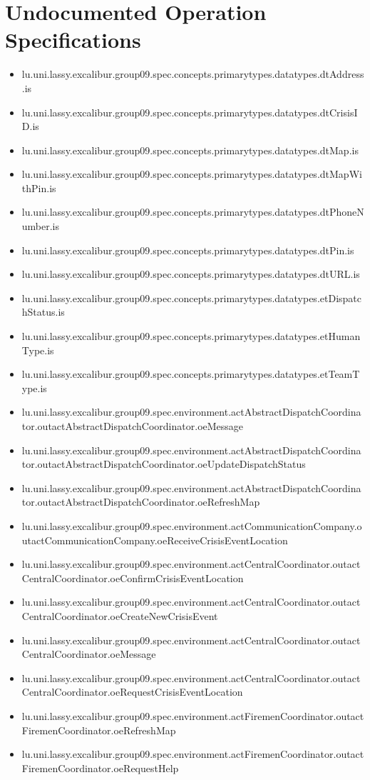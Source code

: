 \section[Undocumented Operation Specifications]{Undocumented Operation Specifications}
\begin{itemize}
\item lu.uni.lassy.excalibur.group09.spec.concepts.primarytypes.datatypes.dtAddress.is 
\item lu.uni.lassy.excalibur.group09.spec.concepts.primarytypes.datatypes.dtCrisisID.is 
\item lu.uni.lassy.excalibur.group09.spec.concepts.primarytypes.datatypes.dtMap.is 
\item lu.uni.lassy.excalibur.group09.spec.concepts.primarytypes.datatypes.dtMapWithPin.is 
\item lu.uni.lassy.excalibur.group09.spec.concepts.primarytypes.datatypes.dtPhoneNumber.is 
\item lu.uni.lassy.excalibur.group09.spec.concepts.primarytypes.datatypes.dtPin.is 
\item lu.uni.lassy.excalibur.group09.spec.concepts.primarytypes.datatypes.dtURL.is 
\item lu.uni.lassy.excalibur.group09.spec.concepts.primarytypes.datatypes.etDispatchStatus.is 
\item lu.uni.lassy.excalibur.group09.spec.concepts.primarytypes.datatypes.etHumanType.is 
\item lu.uni.lassy.excalibur.group09.spec.concepts.primarytypes.datatypes.etTeamType.is 
\item lu.uni.lassy.excalibur.group09.spec.environment.actAbstractDispatchCoordinator.outactAbstractDispatchCoordinator.oeMessage 
\item lu.uni.lassy.excalibur.group09.spec.environment.actAbstractDispatchCoordinator.outactAbstractDispatchCoordinator.oeUpdateDispatchStatus 
\item lu.uni.lassy.excalibur.group09.spec.environment.actAbstractDispatchCoordinator.outactAbstractDispatchCoordinator.oeRefreshMap 
\item lu.uni.lassy.excalibur.group09.spec.environment.actCommunicationCompany.outactCommunicationCompany.oeReceiveCrisisEventLocation 
\item lu.uni.lassy.excalibur.group09.spec.environment.actCentralCoordinator.outactCentralCoordinator.oeConfirmCrisisEventLocation 
\item lu.uni.lassy.excalibur.group09.spec.environment.actCentralCoordinator.outactCentralCoordinator.oeCreateNewCrisisEvent 
\item lu.uni.lassy.excalibur.group09.spec.environment.actCentralCoordinator.outactCentralCoordinator.oeMessage 
\item lu.uni.lassy.excalibur.group09.spec.environment.actCentralCoordinator.outactCentralCoordinator.oeRequestCrisisEventLocation 
\item lu.uni.lassy.excalibur.group09.spec.environment.actFiremenCoordinator.outactFiremenCoordinator.oeRefreshMap 
\item lu.uni.lassy.excalibur.group09.spec.environment.actFiremenCoordinator.outactFiremenCoordinator.oeRequestHelp 
\end{itemize}








